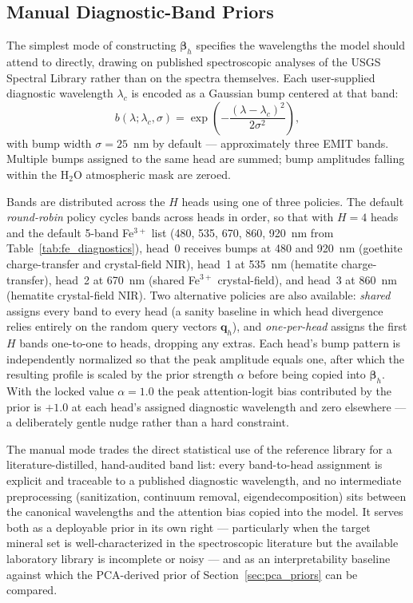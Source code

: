 \documentclass[11pt]{report}
\begin{document}
\subsection{Manual Diagnostic-Band Priors}
\label{sec:manual_priors}

The simplest mode of constructing $\bm{\beta}_h$ specifies the wavelengths the model should attend to directly, drawing on published spectroscopic analyses of the USGS Spectral Library rather than on the spectra themselves.
Each user-supplied diagnostic wavelength $\lambda_c$ is encoded as a Gaussian bump centered at that band:
\begin{equation}
b(\lambda; \lambda_c, \sigma) = \exp\!\left( -\frac{(\lambda - \lambda_c)^2}{2\sigma^2} \right),
\label{eq:gaussian_bump}
\end{equation}
with bump width $\sigma = 25$~nm by default --- approximately three EMIT bands.
Multiple bumps assigned to the same head are summed; bump amplitudes falling within the H$_2$O atmospheric mask are zeroed.

Bands are distributed across the $H$ heads using one of three policies.
The default \emph{round-robin} policy cycles bands across heads in order, so that with $H = 4$ heads and the default 5-band Fe$^{3+}$ list (480, 535, 670, 860, 920~nm from Table~\ref{tab:fe_diagnostics}), head~0 receives bumps at 480 and 920~nm (goethite charge-transfer and crystal-field NIR), head~1 at 535~nm (hematite charge-transfer), head~2 at 670~nm (shared Fe$^{3+}$ crystal-field), and head~3 at 860~nm (hematite crystal-field NIR).
Two alternative policies are also available: \emph{shared} assigns every band to every head (a sanity baseline in which head divergence relies entirely on the random query vectors $\mathbf{q}_h$), and \emph{one-per-head} assigns the first $H$ bands one-to-one to heads, dropping any extras.
Each head's bump pattern is independently normalized so that the peak amplitude equals one, after which the resulting profile is scaled by the prior strength $\alpha$ before being copied into $\bm{\beta}_h$.
With the locked value $\alpha = 1.0$ the peak attention-logit bias contributed by the prior is $+1.0$ at each head's assigned diagnostic wavelength and zero elsewhere --- a deliberately gentle nudge rather than a hard constraint.

The manual mode trades the direct statistical use of the reference library for a literature-distilled, hand-audited band list: every band-to-head assignment is explicit and traceable to a published diagnostic wavelength, and no intermediate preprocessing (sanitization, continuum removal, eigendecomposition) sits between the canonical wavelengths and the attention bias copied into the model.
It serves both as a deployable prior in its own right --- particularly when the target mineral set is well-characterized in the spectroscopic literature but the available laboratory library is incomplete or noisy --- and as an interpretability baseline against which the PCA-derived prior of Section~\ref{sec:pca_priors} can be compared.
\end{document}
